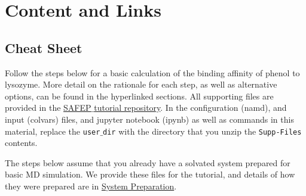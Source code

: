 \documentclass[9pt,tutorial]{livecoms}
\begin{document}

\section{Content and Links}

\subsection{Cheat Sheet}
Follow the steps below for a basic calculation of the binding affinity of phenol to lysozyme. More detail on the rationale for each step, as well as alternative options, can be found in the hyperlinked sections. All supporting files are provided in the \href{https://github.com/jhenin/SAFEP_tutorial}{SAFEP$\_$tutorial repository}. In the configuration (namd), and input (colvars) files, and jupyter notebook (ipynb) as well as commands in this material, replace the \texttt{user$\_$dir} with the directory that you unzip the \texttt{Supp-Files} contents.

The steps below assume that you already have a solvated system prepared for basic MD simulation. We provide these files for the tutorial, and details of how they were prepared are in \hyperref[sec:6.1]{System Preparation}.
\end{document}
